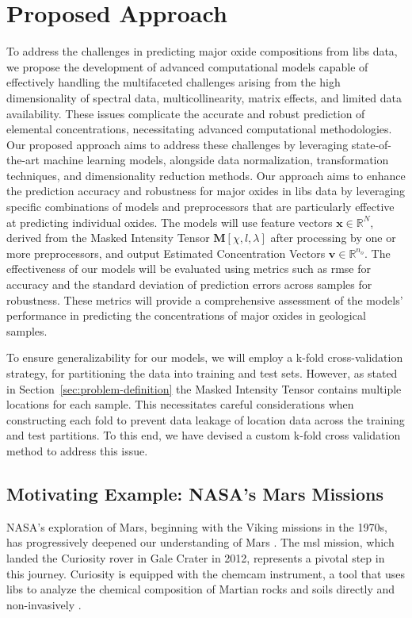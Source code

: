 
\section{Proposed Approach}
To address the challenges in predicting major oxide compositions from \gls{libs} data, we propose the development of advanced computational models capable of effectively handling the multifaceted challenges arising from the high dimensionality of spectral data, multicollinearity, matrix effects, and limited data availability.
These issues complicate the accurate and robust prediction of elemental concentrations, necessitating advanced computational methodologies. 
Our proposed approach aims to address these challenges by leveraging state-of-the-art machine learning models, alongside data normalization, transformation techniques, and dimensionality reduction methods.
Our approach aims to enhance the prediction accuracy and robustness for major oxides in \gls{libs} data by leveraging specific combinations of models and preprocessors that are particularly effective at predicting individual oxides.
The models will use feature vectors $\mathbf{x} \in \mathbb{R}^N$, derived from the Masked Intensity Tensor $\mathbf{M}[\chi, l, \lambda]$ after processing by one or more preprocessors, and output Estimated Concentration Vectors $\mathbf{v} \in \mathbb{R}^{n_o}$.
The effectiveness of our models will be evaluated using metrics such as \gls{rmse} for accuracy and the standard deviation of prediction errors across samples for robustness.
These metrics will provide a comprehensive assessment of the models' performance in predicting the concentrations of major oxides in geological samples.

To ensure generalizability for our models, we will employ a k-fold cross-validation strategy, for partitioning the data into training and test sets.
However, as stated in Section~\ref{sec:problem-definition} the Masked Intensity Tensor contains multiple locations for each sample.
This necessitates careful considerations when constructing each fold to prevent data leakage of location data across the training and test partitions.
To this end, we have devised a custom k-fold cross validation method to address this issue.



\subsection{Motivating Example: NASA's Mars Missions}
NASA's exploration of Mars, beginning with the Viking missions in the 1970s, has progressively deepened our understanding of Mars \cite{marsnasagov_vikings}.
The \gls{msl} mission, which landed the Curiosity rover in Gale Crater in 2012, represents a pivotal step in this journey.
Curiosity is equipped with the \gls{chemcam} instrument, a tool that uses \gls{libs} to analyze the chemical composition of Martian rocks and soils directly and non-invasively \cite{chemcamNasaWebsite}.

